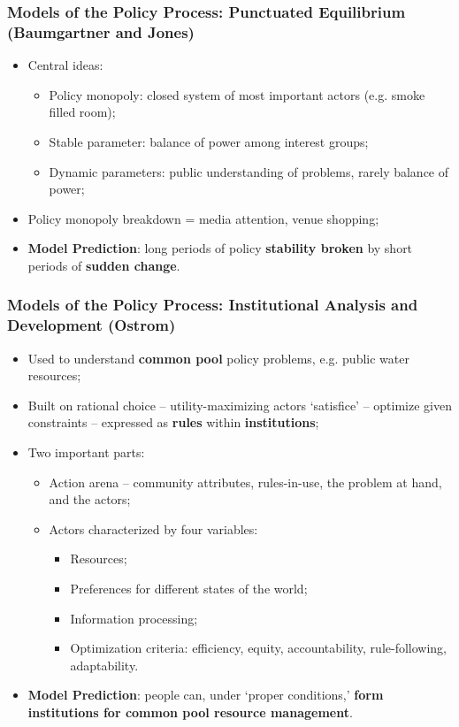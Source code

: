 \documentclass[aspectratio=169]{beamer}
\theoremstyle{principle}
\begin{document}
\begin{frame}
\frametitle{Models of the Policy Process: Punctuated Equilibrium (Baumgartner and Jones)}

\begin{itemize}
\item Central ideas:
\begin{itemize}
\item Policy monopoly: closed system of most important actors (e.g. smoke filled room);
\item Stable parameter: balance of power among interest groups;
\item Dynamic parameters: public understanding of problems, rarely balance of power;
\end{itemize}
\bigskip
\item Policy monopoly breakdown = media attention, venue shopping;
\bigskip
\item \textbf{Model Prediction}: long periods of policy \textbf{stability broken} by short periods of \textbf{sudden change}.
\end{itemize}

\end{frame}

\begin{frame}
\frametitle{Models of the Policy Process: Institutional Analysis and Development (Ostrom)}

\begin{itemize}
\item Used to understand \textbf{common pool} policy problems, e.g. public water resources;
\bigskip
\item Built on rational choice -- utility-maximizing actors `satisfice' -- optimize given constraints -- expressed as \textbf{rules} within \textbf{institutions};
\bigskip
\item Two important parts:
\begin{itemize}
\item Action arena -- community attributes, rules-in-use, the problem at hand, and the actors;
\item Actors characterized by four variables:
\begin{itemize}
\item Resources;
\item Preferences for different states of the world;
\item Information processing;
\item Optimization criteria: efficiency, equity, accountability, rule-following, adaptability.
\end{itemize}
\end{itemize}
\bigskip
\item \textbf{Model Prediction}: people can, under `proper conditions,' \textbf{form institutions for common pool resource management}.
\end{itemize}
\end{frame}
\end{document}
